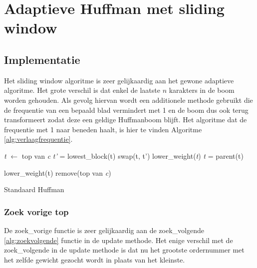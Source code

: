 \documentclass[twoside,twocolumn]{article}
\begin{document}
\section{Adaptieve Huffman met sliding window}

    \subsection{Implementatie}
        Het sliding window algoritme is zeer gelijkaardig aan het gewone adaptieve algoritme.
     Het grote verschil is dat enkel de laatste $n$ karakters in de boom worden gehouden. 
        Als gevolg hiervan wordt een additionele methode gebruikt die de frequentie van een bepaald blad vermindert met 1 en de boom dus ook terug transformeert zodat deze een geldige Huffmanboom blijft.
        Het algoritme dat de frequentie met 1 naar beneden haalt, is hier te vinden Algoritme \ref{alg:verlaagfrequentie}.
        \begin{algorithm}
            \begin{algorithmic}[1]
                    \State \textit{t} $\gets$ top van \textit{c}
                        \State \textit{t'} = lowest\_block(t)
                        \State swap(t, t')
                        \State lower\_weight(\textit{t})
                        \State \textit{t} = parent(t)
                    
                    \EndWhile
                    \State lower\_weight(t)
                    \State {}
                        \State remove(top van \textit{c})
                    \EndIf
                \EndProcedure
            \end{algorithmic}
            \caption{Standaard Huffman}
            \label{alg:verlaagfrequentie}

        \end{algorithm}
        
        \subsubsection{Zoek vorige top}
        De zoek\_vorige functie is zeer gelijkaardig aan de zoek\_volgende \ref{alg:zoekvolgende} functie in de update methode.
        Het enige verschil met de zoek\_volgende in de update methode is dat nu het grootste ordernummer met het zelfde gewicht gezocht wordt in plaats van het kleinste.
        
\end{document}
